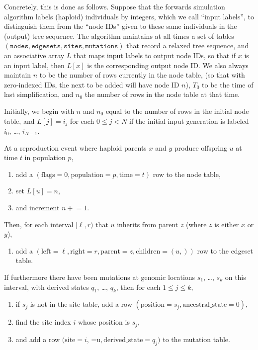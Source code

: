 \documentclass{article}
\newcommand{\nodes}{\texttt{nodes}}
\newcommand{\edgesets}{\texttt{edgesets}}
\newcommand{\sites}{\texttt{sites}}
\newcommand{\mutations}{\texttt{mutations}}
\begin{document}
Concretely, this is done as follows.
Suppose that the forwards simulation algorithm labels (haploid) individuals by integers,
which we call ``input labels'',
to distinguish them from the ``node IDs'' given to these same individuals in the (output) tree sequence.
The algorithm maintains at all times a set of tables $(\nodes, \edgesets, \sites, \mutations)$
that record a relaxed tree sequence,
and an associative array $L$ that maps input labels to output node IDs, so that if $x$ is an input label,
then $L[x]$ is the corresponding output node ID.
We also always maintain $n$ to be the number of rows currently in the node table,
(so that with zero-indexed IDs, the next to be added will have node ID $n$),
$T_0$ to be the time of last simplification,
and $n_0$ the number of rows in the node table at that time.

Initially, we begin with $n$ and $n_0$ equal to the number of rows in the initial node table,
and $L[j] = i_j$ for each $0 \le j < N$ if the initial input generation is labeled
$i_0$, \ldots, $i_{N-1}$.

At a reproduction event where haploid parents $x$ and $y$ produce offspring $u$
at time $t$ in population $p$,
\begin{enumerate}
    \item add a
        $(
        \text{flags}=0,
        \text{population}=p,
        \text{time}=t)$ row to the node table,
    \item set $L[u] = n$,
    \item and increment $n\mathrel{+}=1$.
\end{enumerate}
Then, for each interval $[\ell,r)$ that $u$ inherits from parent $z$
(where $z$ is either $x$ or $y$),
\begin{enumerate}[resume]
    \item add a
        $( \text{left}=\ell,
        \text{right}=r,
        \text{parent}=z,
        \text{children}=(u,))$ row to the edgeset table.
\end{enumerate}
If furthermore there have been mutations at genomic locations $s_1$, \ldots, $s_k$
on this interval,
with derived states $q_1$, \ldots, $q_k$,
then for each $1 \le j \le k$,
\begin{enumerate}[resume]
    \item if $s_j$ is not in the site table, add a row
        $( \text{position}=s_j,
        \text{ancestral\_state}=0)$,
    \item find the site index $i$ whose position is $s_j$,
    \item and add a row
        $( \text{site}=i$,
           =u$,
        \text{derived\_state}=q_j)$ to the mutation table.
\end{enumerate}
\end{document}
